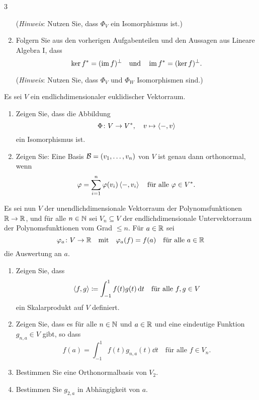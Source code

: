 \begin{question}[subtitle = Zusammenhang zwischen Skalarproduktraum und Dualraum]{3}
\begin{enumerate}[leftmargin=*, resume]
      (\emph{Hinweis}:
       Nutzen Sie, dass $\Phi_V$ ein Isomorphismus ist.)
    \item
      Folgern Sie aus den vorherigen Aufgabenteilen und den Aussagen aus Lineare Algebra I, dass
      \[
          \ker f^*
        = (\operatorname{im} f)^\perp
        \quad\text{und}\quad
          \operatorname{im} f^*
        = (\ker f)^\perp.
      \]
      
      (\emph{Hinweis}:
       Nutzen Sie, dass $\Phi_V$ und $\Phi_W$ Isomorphismen sind.)
  \end{enumerate}
\end{question}


\begin{question}[subtitle = Eine Anwendung des Rieszschen Darstellungssatzes]{3}
  Es sei $V$ ein endlichdimensionaler euklidischer Vektorraum.
  \begin{enumerate}[leftmargin=*]
    \item
      Zeigen Sie, dass die Abbildung
      \[
        \Phi \colon V \to V^*,
        \quad
        v \mapsto \left\langle -,v \right\rangle
      \]
      ein Isomorphismus ist.
    \item
      Zeigen Sie:
      Eine Basis $\mathcal{B} = (v_1, \dotsc, v_n)$ von $V$ ist genau dann orthonormal, wenn
      \[
          \varphi
        = \sum_{i=1}^n \varphi(v_i) \left\langle -,v_i \right\rangle
        \quad
        \text{für alle $\varphi \in V^*$}.
      \]
  \end{enumerate}
  Es sei nun $V$ der unendlichdimensionale Vektorraum der Polynomsfunktionen $\mathbb{R} \to \mathbb{R}$, und für alle $n \in \mathbb{N}$ sei $V_n \subseteq V$ der endlichdimensionale Untervektorraum der Polynomsfunktionen vom Grad $\leq n$.
  Für $a \in \mathbb{R}$ sei
  \[
    \varphi_a \colon V \to \mathbb{R}
    \quad\text{mit}\quad
    \varphi_a(f) = f(a)
    \quad
    \text{für alle $a \in \mathbb{R}$}
  \]
  die Auswertung an $a$.
  \begin{enumerate}[leftmargin=*, resume]
    \item
      Zeigen Sie, dass
      \[
        \left\langle f, g \right\rangle \coloneqq \int_{-1}^1 f(t)g(t) \,\text{d}t
        \quad
        \text{für alle $f, g \in V$}
      \]
      ein Skalarprodukt auf $V$ definiert.
    \item
      Zeigen Sie, dass es für alle $n \in \mathbb{N}$ und $a \in \mathbb{R}$ und eine eindeutige Funktion $g_{n,a} \in V$ gibt, so dass
      \[
          f(a)
        = \int_{-1}^1 f(t) g_{n,a}(t) \dd{t}
        \quad
        \text{für alle $f \in V_n$}.
      \]
    \item
      Bestimmen Sie eine Orthonormalbasis von $V_2$.
    \item
      Bestimmen Sie $g_{2,a}$ in Abhängigkeit von $a$.
  \end{enumerate}
\end{question}


